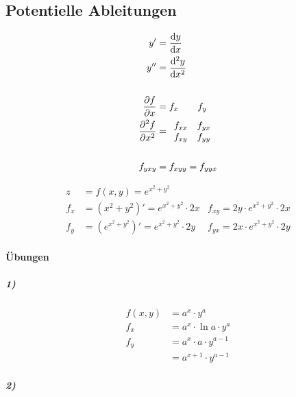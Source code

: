 \subsection{Potentielle Ableitungen}


\begin{align*}
	y'                                & = \frac{\mathop{}\!\mathrm{d} y}{\mathop{}\!\mathrm{d} x}     \\
	y''                               & = \frac{\mathop{}\!\mathrm{d}^2 y}{\mathop{}\!\mathrm{d} x^2} \\
	\\
	\frac{\partial f}{\partial x}     & = f_x \qquad f_y              \\
	\frac{\partial^2 f}{\partial x^2} & =
	\begin{array}{ll}
		f_{xx} & f_{yx} \\
		f_{xy} & f_{yy}
	\end{array}                                         \\
	\\
	f_{yxy}                           & = f_{xyy} = f_{yyx}
\end{align*}

\begin{align*}
	z   & = f(x, y) = e^{x^2 + y^2}                                 \\
	f_x & = \left( x^2 + y^2 \right)' = e^{x^2 + y^2} \cdot 2 x
	    & f_{xy} = 2y \cdot e^{x^2 + y^2} \cdot 2x                  \\
	f_y & = \left( e^{x^2 + y^2} \right)' = e^{x^2 + y^2} \cdot 2 y
	    & f_{yx} = 2x \cdot e^{x^2 + y^2} \cdot 2y
\end{align*}

\paragraph{Übungen}

\subparagraph{1)}

\begin{align*}
	f(x, y) & = a^x \cdot y^a             \\
	f_x     & = a^x \cdot \ln a \cdot y^a \\
	f_y     & = a^x \cdot a \cdot y^{a-1} \\
	        & = a^{x+1} \cdot y^{a-1}
\end{align*}

\subparagraph{2)}

